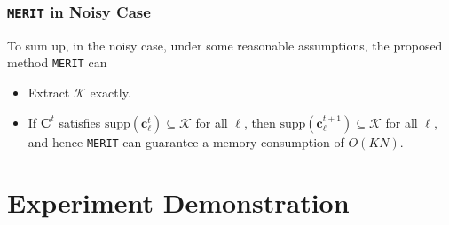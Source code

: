 \documentclass[10pt,xcolor={usenames,dvipsnames,table}]{beamer}
\newcommand\coolover[2]{\mathrlap{\smash{\overbrace{\phantom{%
    \begin{matrix} #2 \end{matrix}}}^{\mbox{$#1$}}}}#2}
\newcommand{\tikzmarkx}[2]{\tikz[overlay,remember picture,
  baseline=(#1.base)] \node (#1) {#2};}
\newcommand{\Highlight}[1][submatrix]{%
    \tikz[overlay,remember picture]{
    \node[highlight,fit=(left.north west) (right.south east)] (#1) {};}
}
\begin{document}
%



\begin{frame}
    \frametitle{\texttt{MERIT} in Noisy Case}
    To sum up, in the noisy case, under some reasonable assumptions, the proposed method \texttt{MERIT} can
    \begin{itemize}
        \item Extract $\mathcal{K}$ exactly.
        \item If $\bm{C}^{t}$ satisfies $\text{supp}(\bm{c}_\ell^{t}) \subseteq \mathcal{K}$ for all $\ell$, then $\text{supp}(\bm{c}_\ell^{t+1}) \subseteq \mathcal{K}$ for all $\ell$, and hence \texttt{MERIT} can guarantee a memory consumption of $O(KN)$.
    \end{itemize}
\end{frame}



\section{Experiment Demonstration}%
\label{sec:real_demonstration}
\end{document}
